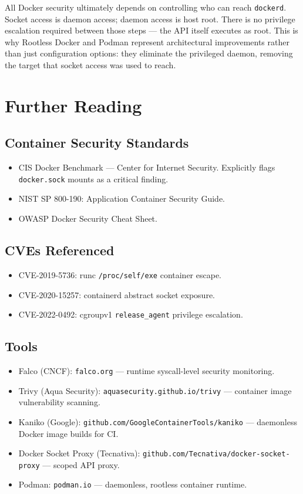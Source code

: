 All Docker security ultimately depends on controlling who can reach \texttt{dockerd}. Socket access is daemon access; daemon access is host root. There is no privilege escalation required between those steps --- the API itself executes as root. This is why Rootless Docker and Podman represent architectural improvements rather than just configuration options: they eliminate the privileged daemon, removing the target that socket access was used to reach.


\section{Further Reading}

\subsection*{Container Security Standards}
\begin{itemize}
    \item CIS Docker Benchmark --- Center for Internet Security. Explicitly flags \texttt{docker.sock} mounts as a critical finding.
    \item NIST SP 800-190: Application Container Security Guide.
    \item OWASP Docker Security Cheat Sheet.
\end{itemize}

\subsection*{CVEs Referenced}
\begin{itemize}
    \item CVE-2019-5736: runc \texttt{/proc/self/exe} container escape.
    \item CVE-2020-15257: containerd abstract socket exposure.
    \item CVE-2022-0492: cgroupv1 \texttt{release\_agent} privilege escalation.
\end{itemize}

\subsection*{Tools}
\begin{itemize}
    \item Falco (CNCF): \texttt{falco.org} --- runtime syscall-level security monitoring.
    \item Trivy (Aqua Security): \texttt{aquasecurity.github.io/trivy} --- container image vulnerability scanning.
    \item Kaniko (Google): \texttt{github.com/GoogleContainerTools/kaniko} --- daemonless Docker image builds for CI.
    \item Docker Socket Proxy (Tecnativa): \texttt{github.com/Tecnativa/docker-socket-proxy} --- scoped API proxy.
    \item Podman: \texttt{podman.io} --- daemonless, rootless container runtime.
\end{itemize}

